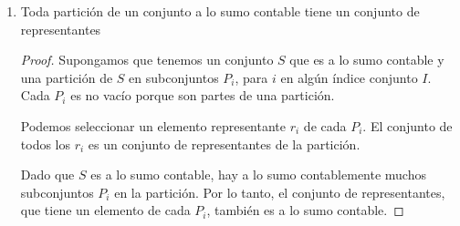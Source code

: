 \documentclass{article}
\begin{document}
\begin{enumerate}
  \item Toda partición de un conjunto a lo sumo contable tiene un conjunto de representantes\\ 
    \begin{proof}
      Supongamos que tenemos un conjunto $S$ que es a lo sumo contable y una partición de $S$ en subconjuntos $P_i$, para $i$ en algún índice conjunto $I$. Cada $P_i$ es no vacío porque son partes de una partición.

      Podemos seleccionar un elemento representante $r_i$ de cada $P_i$. El conjunto de todos los $r_i$ es un conjunto de representantes de la partición.

      Dado que $S$ es a lo sumo contable, hay a lo sumo contablemente muchos subconjuntos $P_i$ en la partición. Por lo tanto, el conjunto de representantes, que tiene un elemento de cada $P_i$, también es a lo sumo contable.
    \end{proof}
\end{enumerate}



\end{document}

